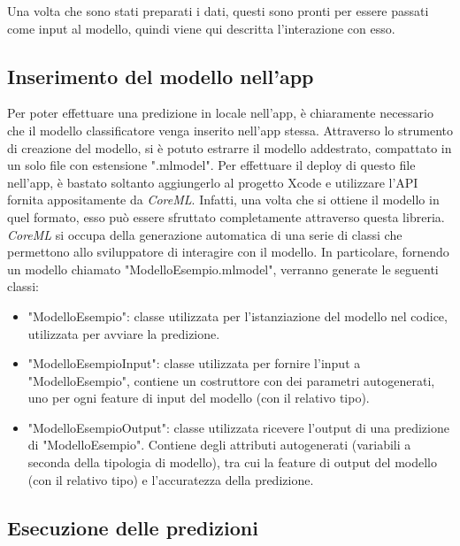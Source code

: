 Una volta che sono stati preparati i dati, questi sono pronti per essere passati
come input al modello, quindi viene qui descritta l'interazione con esso.

\subsection{Inserimento del modello nell'app}

Per poter effettuare una predizione in locale nell'app, è chiaramente necessario che 
il modello classificatore venga inserito nell'app stessa. Attraverso lo strumento di 
creazione del modello, si è potuto estrarre il modello addestrato, compattato in un 
solo file con estensione ".mlmodel". Per effettuare il deploy di questo file nell'app,
è bastato soltanto aggiungerlo al progetto Xcode e utilizzare l'API fornita 
appositamente da \emph{CoreML}. Infatti, una volta che si ottiene il modello in quel
formato, esso può essere sfruttato completamente attraverso questa libreria.
\emph{CoreML} si occupa della generazione automatica di una serie di classi che 
permettono allo sviluppatore di interagire con il modello. In particolare, fornendo
un modello chiamato "ModelloEsempio.mlmodel", verranno generate le seguenti classi:
\begin{itemize}
    \item "ModelloEsempio": classe utilizzata per l'istanziazione del modello nel
    codice, utilizzata per avviare la predizione.
    \item "ModelloEsempioInput": classe utilizzata per fornire l'input a "ModelloEsempio",
    contiene un costruttore con dei parametri autogenerati, uno per ogni feature di
    input del modello (con il relativo tipo).
    \item "ModelloEsempioOutput":  classe utilizzata ricevere l'output di una predizione
    di "ModelloEsempio". Contiene degli attributi autogenerati (variabili a seconda della
    tipologia di modello), tra cui la feature di output del modello (con il relativo tipo)
    e l'accuratezza della predizione.
\end{itemize}

\subsection{Esecuzione delle predizioni}

